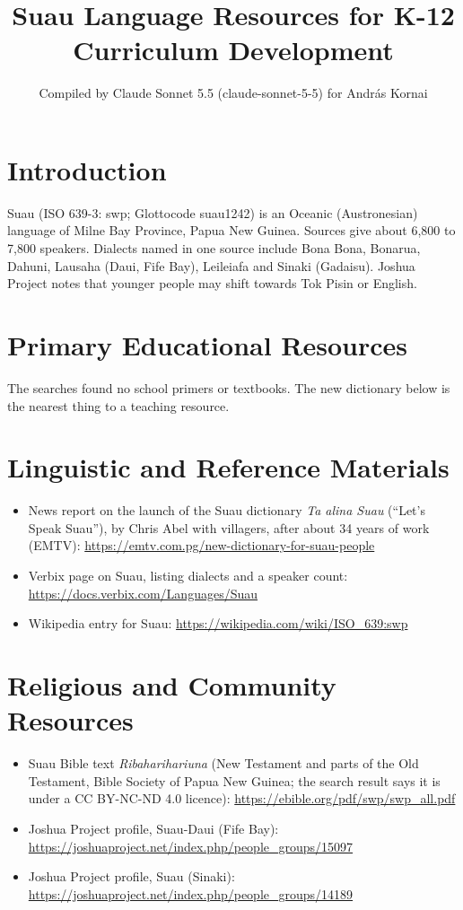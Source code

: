 \documentclass[12pt]{article}
\title{Suau Language Resources for K-12 Curriculum Development}
\author{Compiled by Claude Sonnet 5.5 (claude-sonnet-5-5) for Andr\'as Kornai}
\date{}
\begin{document}
\maketitle

\section{Introduction}
Suau (ISO 639-3: swp; Glottocode suau1242) is an Oceanic (Austronesian) language of Milne Bay Province, Papua New Guinea. Sources give about 6,800 to 7,800 speakers. Dialects named in one source include Bona Bona, Bonarua, Dahuni, Lausaha (Daui, Fife Bay), Leileiafa and Sinaki (Gadaisu). Joshua Project notes that younger people may shift towards Tok Pisin or English.

\section{Primary Educational Resources}
The searches found no school primers or textbooks. The new dictionary below is the nearest thing to a teaching resource.

\section{Linguistic and Reference Materials}
\begin{itemize}
\item News report on the launch of the Suau dictionary \emph{Ta alina Suau} (``Let's Speak Suau''), by Chris Abel with villagers, after about 34 years of work (EMTV): \url{https://emtv.com.pg/new-dictionary-for-suau-people}
\item Verbix page on Suau, listing dialects and a speaker count: \url{https://docs.verbix.com/Languages/Suau}
\item Wikipedia entry for Suau: \url{https://wikipedia.com/wiki/ISO_639:swp}
\end{itemize}

\section{Religious and Community Resources}
\begin{itemize}
\item Suau Bible text \emph{Ribaharihariuna} (New Testament and parts of the Old Testament, Bible Society of Papua New Guinea; the search result says it is under a CC BY-NC-ND 4.0 licence): \url{https://ebible.org/pdf/swp/swp_all.pdf}
\item Joshua Project profile, Suau-Daui (Fife Bay): \url{https://joshuaproject.net/index.php/people_groups/15097}
\item Joshua Project profile, Suau (Sinaki): \url{https://joshuaproject.net/index.php/people_groups/14189}
\end{itemize}
\end{document}
